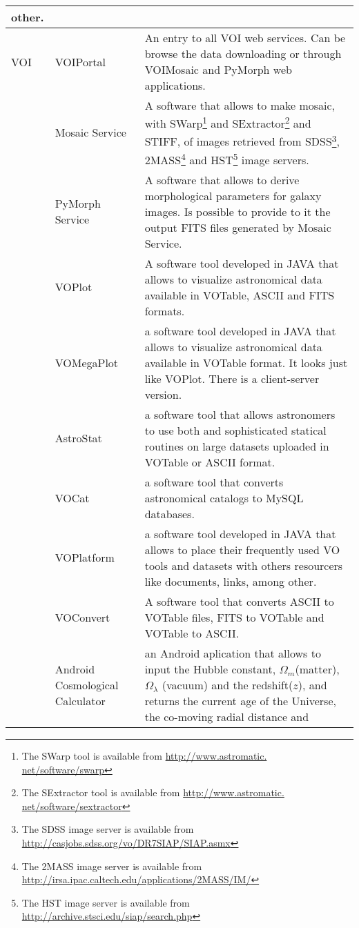 \begin{table*}[h!t]
\begin{tabular}{|l|l|p{12.5cm}|}
									other. \\
	\hline								
	VOI		& VOIPortal & An entry to all VOI web services. Can be browse the data downloading or through VOIMosaic and PyMorph web applications.\\
			& Mosaic Service & A software that allows to make mosaic, with SWarp\footnote{The SWarp tool is available from \url{http://www.astromatic.
									net/software/swarp}} and SExtractor\footnote{The SExtractor tool is available from \url{http://www.astromatic.
									net/software/sextractor}} and STIFF, of images retrieved from SDSS\footnote{The SDSS image server is available from 
									\url{http://casjobs.sdss.org/vo/DR7SIAP/SIAP.asmx}}, 2MASS\footnote{The 2MASS image server is available from 
									\url{http://irsa.ipac.caltech.edu/applications/2MASS/IM/}} and HST\footnote{The HST image server is available from 
									\url{http://archive.stsci.edu/siap/search.php}} image servers.\\
			& PyMorph Service & A software that allows to derive morphological parameters for galaxy images. Is possible to provide to it the output FITS
									files generated by Mosaic Service.\\
			& VOPlot & A software tool developed in JAVA that allows to visualize astronomical data available in VOTable, ASCII and FITS formats.\\
			& VOMegaPlot & a software tool developed in JAVA that allows to visualize astronomical data available in VOTable format. It looks just like 
									VOPlot. There is a client-server version.\\
			& AstroStat & a software tool that allows astronomers to use both and sophisticated statical routines on large datasets uploaded in VOTable or
									ASCII format. \\
			& VOCat & a software tool that converts astronomical catalogs to MySQL databases. \\
			& VOPlatform& a software tool developed in JAVA that allows to place their frequently used VO tools and datasets with others resourcers like 
									documents, links, among other. \\
			& VOConvert & A software tool that converts ASCII to VOTable files, FITS to VOTable and VOTable to ASCII. \\
			& Android Cosmological Calculator & an Android aplication that allows to input the Hubble constant, $ \Omega_{m} $(matter), $ \Omega_{\lambda} 
									$ (vacuum) and the redshift($ z $), and returns the current age of the Universe, the co-moving radial distance and 

\end{tabular}
\end{table*}
